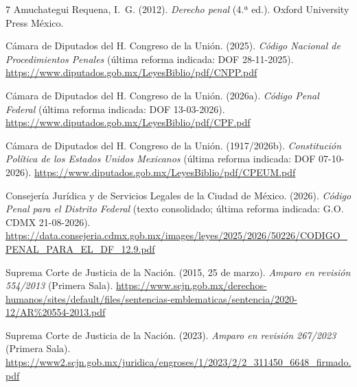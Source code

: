 \documentclass[spanish,letterpaper,oneside]{article}
\begin{document}
\clearpage
\begingroup\footnotesize
\begin{thebibliography}{7}
Amuchategui Requena, I.~G. (2012). \emph{Derecho penal} (4.ª ed.). Oxford University Press México.

Cámara de Diputados del H. Congreso de la Unión. (2025). \emph{Código Nacional de Procedimientos Penales} (última reforma indicada: DOF 28-11-2025). \url{https://www.diputados.gob.mx/LeyesBiblio/pdf/CNPP.pdf}

Cámara de Diputados del H. Congreso de la Unión. (2026a). \emph{Código Penal Federal} (última reforma indicada: DOF 13-03-2026). \url{https://www.diputados.gob.mx/LeyesBiblio/pdf/CPF.pdf}

Cámara de Diputados del H. Congreso de la Unión. (1917/2026b). \emph{Constitución Política de los Estados Unidos Mexicanos} (última reforma indicada: DOF 07-10-2026). \url{https://www.diputados.gob.mx/LeyesBiblio/pdf/CPEUM.pdf}

Consejería Jurídica y de Servicios Legales de la Ciudad de México. (2026). \emph{Código Penal para el Distrito Federal} (texto consolidado; última reforma indicada: G.O. CDMX 21-08-2026). \url{https://data.consejeria.cdmx.gob.mx/images/leyes/2025/2026/50226/CODIGO_PENAL_PARA_EL_DF_12.9.pdf}

Suprema Corte de Justicia de la Nación. (2015, 25 de marzo). \emph{Amparo en revisión 554/2013} (Primera Sala). \url{https://www.scjn.gob.mx/derechos-humanos/sites/default/files/sentencias-emblematicas/sentencia/2020-12/AR%20554-2013.pdf}

Suprema Corte de Justicia de la Nación. (2023). \emph{Amparo en revisión 267/2023} (Primera Sala). \url{https://www2.scjn.gob.mx/juridica/engroses/1/2023/2/2_311450_6648_firmado.pdf}
\end{thebibliography}
\endgroup
\end{document}
